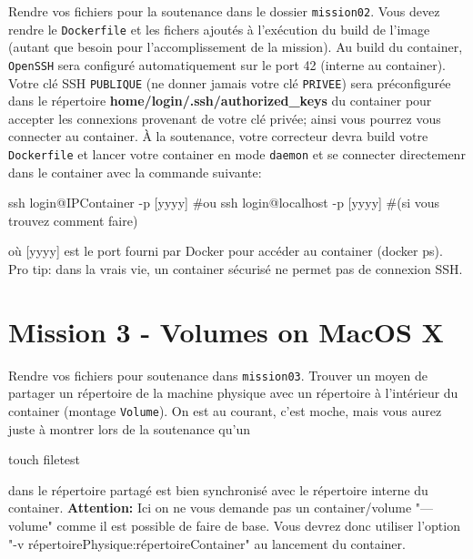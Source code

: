 \documentclass{42}
\begin{document}
Rendre vos fichiers pour la soutenance dans le dossier \texttt{mission02}. Vous devez rendre le \texttt{Dockerfile} et les fichers ajoutés à l'exécution du build de l'image (autant que besoin pour l'accomplissement de la mission).
\newline
\newline
Au build du container, \texttt{OpenSSH} sera configuré automatiquement sur le port 42 (interne au container). Votre clé SSH \texttt{PUBLIQUE} (ne donner jamais votre clé \texttt{PRIVEE}) sera préconfigurée dans le répertoire \textbf{home/login/.ssh/authorized\_keys} du container pour accepter les connexions provenant de votre clé privée; ainsi vous pourrez vous connecter au container.
\newline
\newline
À la soutenance, votre correcteur devra build votre \texttt{Dockerfile} et lancer votre container en mode \texttt{daemon} et se connecter directemenr dans le container avec la commande suivante:
\begin{42console}
ssh login@IPContainer -p [yyyy] #ou
ssh login@localhost -p [yyyy] #(si vous trouvez comment faire)
\end{42console}
où [yyyy] est le port fourni par Docker pour accéder au container (docker ps).
\newline
\newline
\info
{
	Pro tip: dans la vrais vie, un container sécurisé ne permet pas de connexion SSH.
}

	\newpage

\section{Mission 3 - Volumes on MacOS X}

Rendre vos fichiers pour soutenance dans \texttt{mission03}.
\newline
\newline
Trouver un moyen de partager un répertoire de la machine physique avec un répertoire à l'intérieur du container (montage \texttt{Volume}).
On est au courant, c’est moche, mais vous aurez juste à montrer lors de la soutenance qu’un
\begin{42console}
	touch filetest
\end{42console}
dans le répertoire partagé est bien synchronisé avec le répertoire interne du container.
\newline
\newline
\newline
\warn
{
\textbf{Attention:} Ici on ne vous demande pas un container/volume "---volume" comme il est possible de faire de base. Vous devrez donc utiliser l’option
"-v répertoirePhysique:répertoireContainer" au lancement du container.
}
\end{document}

